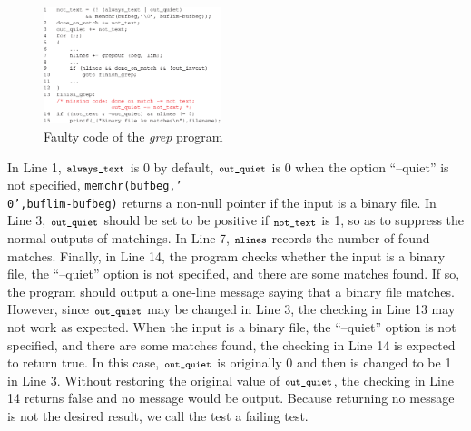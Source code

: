 \documentclass{sig-alternate}
\newcommand{\CodeIn}[1]{{\small\texttt{#1}}}
\begin{document}
\begin{figure}[t]
\begin{center}
  \includegraphics[width=0.46\textwidth]{figs/example11.eps}
  \centering
  \caption{Faulty code of the \emph{grep} program}
  \label{fig:example1}
\end{center} %
\end{figure}



In Line 1, $\CodeIn{always\_text}$ is 0 by default,
$\CodeIn{out\_quiet}$ is 0 when the option ``--quiet'' is not
specified, \CodeIn{memchr(bufbeg,'\\0',buflim-bufbeg)} returns a
non-null pointer if the input is a binary file. In Line 3,
$\CodeIn{out\_quiet}$ should be set to be positive if
$\CodeIn{not\_text}$ is 1, so as to suppress the normal outputs of
matchings. In Line 7, $\CodeIn{nlines}$ records the number of found
matches. Finally, in Line 14, the program checks whether the input
is a binary file, the ``--quiet'' option is not specified, and there
are some matches found. If so, the program should output a one-line
message saying that a binary file matches. However, since
$\CodeIn{out\_quiet}$ may be changed in Line 3, the checking in Line
13 may not work as expected. When the input is a binary file, the
``--quiet'' option is not specified, and there are some matches
found, the checking in Line 14 is expected to return true. In this
case, $\CodeIn{out\_quiet}$ is originally 0 and then is changed to
be 1 in Line 3. Without restoring the original value of
$\CodeIn{out\_quiet}$, the checking in Line 14 returns false and no
message would be output. Because returning no message is not the
desired result, we call the test a failing test.
\end{document}
